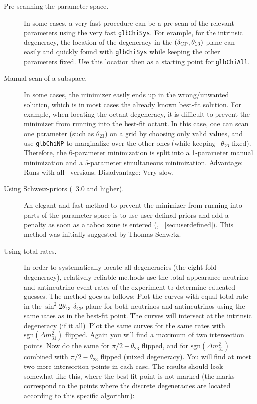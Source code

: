 \begin{description}
\item[Pre-scanning the parameter space.] In some cases, a very fast procedure can be a pre-scan 
of the relevant parameters using the very fast {\tt glbChiSys}. For example, for the intrinsic degeneracy, the location of the degeneracy in the $(\delta_{\mathrm{CP}},\theta_{13})$ plane can easily and quickly found with {\tt glbChiSys} while keeping the other parameters fixed. Use this location then as a starting point for {\tt glbChiAll}.
\item[Manual scan of a subspace.] In some cases, the minimizer easily ends up in the wrong/unwanted solution, which is in most cases the already known best-fit solution. For example, when locating the octant degeneracy, it is difficult to prevent the minimizer from running into the best-fit octant. In this case, one can scan one parameter (such as $\theta_{23}$) on a grid by choosing only valid values, and use {\tt glbChiNP} to marginalize over the other ones (while keeping \eg\ $\theta_{23}$ fixed). Therefore, the 6-parameter minimization is split into a 1-parameter manual minimization and a 5-parameter simultaneous minimization. Advantage: Runs with all \GLOBES\ versions. Disadvantage: Very slow. 
\item[Using Schwetz-priors (\GLOBES\ 3.0 and higher).] An elegant and fast method to prevent the minimizer from running into parts of the parameter space is to use user-defined priors and add a penalty as soon as a taboo zone is entered (\cf, \Sec~\ref{sec:userdefined}). This method was initially suggested by Thomas Schwetz.
\item[Using total rates.] In order to systematically locate all degeneracies (the eight-fold degeneracy), relatively reliable methods use the total appearance neutrino and antineutrino event rates of the experiment to determine educated guesses. The method goes as follows: Plot the curves with equal total rate in the $\sin^2 2 \theta_{13}$-$\delta_{\mathrm{CP}}$-plane for both neutrinos and antineutrinos using the same rates as in the best-fit point. The curves will intersect at the intrinsic degeneracy (if it all). Plot the same curves for the same rates with $\mathrm{sgn}(\Delta m_{31}^2)$ flipped. Again you will find a maximum of two intersection points. Now do the same for $\pi/2 - \theta_{23}$ flipped, and for  $\mathrm{sgn}(\Delta m_{31}^2)$ combined with $\pi/2 - \theta_{23}$ flipped (mixed degeneracy). You will find at most two more intersection points in each case.
The results should look somewhat like this, where the best-fit point is not marked (the marks correspond to the points where the discrete degeneracies are located according to this specific algorithm):

\end{description}
